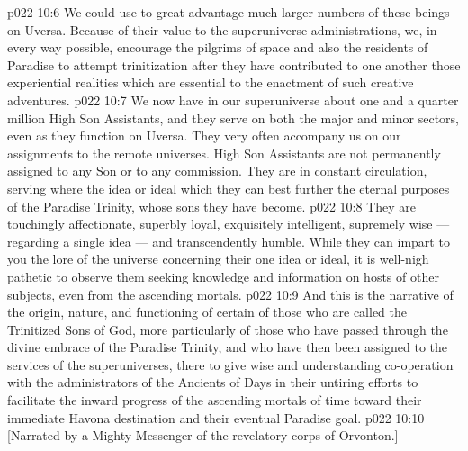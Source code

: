 \vs p022 10:6 We could use to great advantage much larger numbers of these beings on Uversa. Because of their value to the superuniverse administrations, we, in every way possible, encourage the pilgrims of space and also the residents of Paradise to attempt trinitization after they have contributed to one another those experiential realities which are essential to the enactment of such creative adventures.
\vs p022 10:7 \pc We now have in our superuniverse about one and a quarter million High Son Assistants, and they serve on both the major and minor sectors, even as they function on Uversa. They very often accompany us on our assignments to the remote universes. High Son Assistants are not permanently assigned to any Son or to any commission. They are in constant circulation, serving where the idea or ideal which they  can best further the eternal purposes of the Paradise Trinity, whose sons they have become.
\vs p022 10:8 They are touchingly affectionate, superbly loyal, exquisitely intelligent, supremely wise --- regarding a single idea --- and transcendently humble. While they can impart to you the lore of the universe concerning their one idea or ideal, it is well\hyp{}nigh pathetic to observe them seeking knowledge and information on hosts of other subjects, even from the ascending mortals.
\vs p022 10:9 \pc And this is the narrative of the origin, nature, and functioning of certain of those who are called the Trinitized Sons of God, more particularly of those who have passed through the divine embrace of the Paradise Trinity, and who have then been assigned to the services of the superuniverses, there to give wise and understanding co\hyp{}operation with the administrators of the Ancients of Days in their untiring efforts to facilitate the inward progress of the ascending mortals of time toward their immediate Havona destination and their eventual Paradise goal.
\vsetoff
\vs p022 10:10 [Narrated by a Mighty Messenger of the revelatory corps of Orvonton.]
